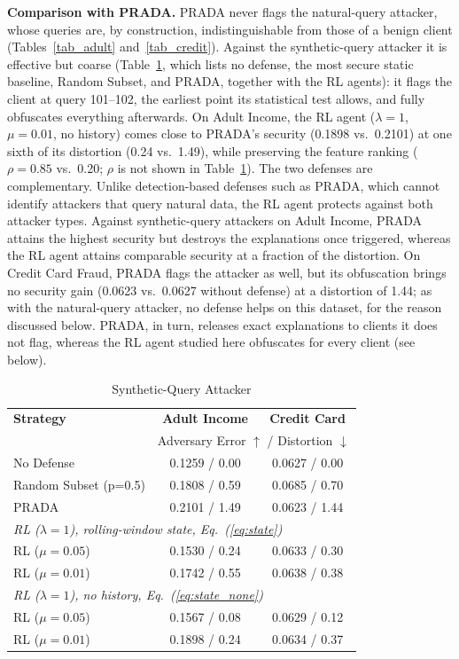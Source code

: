\documentclass[conference]{IEEEtran}
\DeclareRobustCommand{\rev}[1]{{\color{blue}#1}}
\DeclareRobustCommand{\revnew}[1]{{\color{revpurple}#1}}
\begin{document}
\rev{\textbf{Comparison with PRADA.} PRADA never flags the natural-query attacker, whose queries are, by construction, indistinguishable from those of a benign client (Tables~\ref{tab_adult} and~\ref{tab_credit}). Against the synthetic-query attacker it is effective but coarse (Table~\ref{tab_synth}\revnew{, which lists no defense, the most secure static baseline, Random Subset, and PRADA, together with the RL agents}): it flags the client at query 101--102, the earliest point its statistical test allows, and fully obfuscates everything afterwards. On Adult Income, the RL agent ($\lambda=1$, $\mu=0.01$, no history) comes close to PRADA's security (0.1898 vs.\ 0.2101) at one sixth of its distortion (0.24 vs.\ 1.49), while preserving the feature ranking ($\rho=0.85$ vs.\ 0.20\revnew{; $\rho$ is not shown in Table~\ref{tab_synth}}). The two defenses are complementary. Unlike detection-based defenses such as PRADA, which cannot identify attackers that query natural data, the RL agent protects against both attacker types. Against synthetic-query attackers \revnew{on Adult Income}, PRADA attains the highest security but destroys the explanations once triggered, whereas the RL agent attains comparable security at a fraction of the distortion. \revnew{On Credit Card Fraud, PRADA flags the attacker as well, but its obfuscation brings no security gain (0.0623 vs.\ 0.0627 without defense) at a distortion of 1.44; as with the natural-query attacker, no defense helps on this dataset, for the reason discussed below.} PRADA, in turn, releases exact explanations to clients it does not flag, whereas the RL agent studied here obfuscates for every client (see below).}

\begin{table}[t]
\caption{\rev{Synthetic-Query Attacker}}
\begin{center}
\rev{
\begin{tabular}{lcc}
\toprule
\textbf{Strategy} & \textbf{Adult Income} & \textbf{Credit Card} \\
 & \multicolumn{2}{c}{\revnew{\footnotesize Adversary Error $\uparrow$ / Distortion $\downarrow$}} \\
\midrule
No Defense & 0.1259 / 0.00 & 0.0627 / 0.00 \\
Random Subset (p=0.5) & 0.1808 / 0.59 & 0.0685 / 0.70 \\
PRADA \cite{b17} & 0.2101 / 1.49 & 0.0623 / 1.44 \\
\midrule
\multicolumn{3}{l}{\textit{RL ($\lambda=1$), rolling-window state\revnew{, Eq.~(\ref{eq:state})}}} \\
RL ($\mu = 0.05$) & 0.1530 / 0.24 & 0.0633 / 0.30 \\
RL ($\mu = 0.01$) & 0.1742 / 0.55 & 0.0638 / 0.38 \\
\multicolumn{3}{l}{\textit{RL ($\lambda=1$), no history\revnew{, Eq.~(\ref{eq:state_none})}}} \\
RL ($\mu = 0.05$) & 0.1567 / 0.08 & 0.0629 / 0.12 \\
RL ($\mu = 0.01$) & 0.1898 / 0.24 & 0.0634 / 0.37 \\
\bottomrule
\end{tabular}
}
\label{tab_synth}
\end{center}
\end{table}
\end{document}
